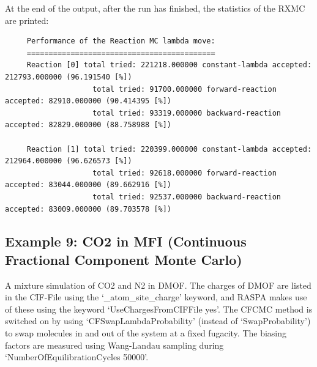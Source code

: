 At the end of the output, after the run has finished, the statistics of the RXMC are printed:
\begin{tiny}
\begin{verbatim}
     Performance of the Reaction MC lambda move:
     ===========================================
     Reaction [0] total tried: 221218.000000 constant-lambda accepted: 212793.000000 (96.191540 [%])
                    total tried: 91700.000000 forward-reaction accepted: 82910.000000 (90.414395 [%])
                    total tried: 93319.000000 backward-reaction accepted: 82829.000000 (88.758988 [%])
     
     Reaction [1] total tried: 220399.000000 constant-lambda accepted: 212964.000000 (96.626573 [%])
                    total tried: 92618.000000 forward-reaction accepted: 83044.000000 (89.662916 [%])
                    total tried: 92537.000000 backward-reaction accepted: 83009.000000 (89.703578 [%])
\end{verbatim}
\end{tiny}

\subsection*{Example 9: CO2 in MFI (Continuous Fractional Component Monte Carlo)}

A mixture simulation of CO2 and N2 in DMOF. The charges of DMOF are listed in the CIF-File using the `\_atom\_site\_charge' keyword,
and RASPA makes use of these using the keyword `UseChargesFromCIFFile yes'.
The CFCMC method is switched on by using `CFSwapLambdaProbability' (instead of `SwapProbability') to swap molecules in and out of the system at a fixed fugacity.
The biasing factors are measured using Wang-Landau sampling during `NumberOfEquilibrationCycles 50000'.

